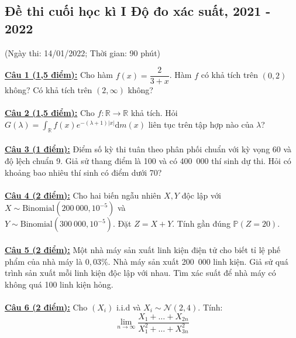 \documentclass[10pt, a4paper]{article}
\begin{document}
\newpage

\subsection{Đề thi cuối học kì I Độ đo xác suất, 2021 - 2022}
\begin{center}
	\color{blue}(Ngày thi: 14/01/2022; Thời gian: 90 phút)
\end{center}
\color{red}\underline{\textbf{Câu 1 (1,5 điểm):}} \color{black}Cho hàm $f(x)=\dfrac{2}{3+x}$. Hàm $f$ có khả tích trên $(0,2)$ không? Có khả tích trên $(2,\infty)$ không?\\\\
\color{red}\underline{\textbf{Câu 2 (1,5 điểm):}} \color{black}Cho $f:\mathbb R\rightarrow\mathbb R$ khả tích. Hỏi $G(\lambda)=\displaystyle\int_{\mathbb R}f(x)e^{-(\lambda+1)|x|}\text{d}m(x)$ liên tục trên tập hợp nào của $\lambda$?\\\\
\color{red}\underline{\textbf{Câu 3 (1 điểm):}} \color{black}Điểm số kỳ thi tuân theo phân phối chuẩn với kỳ vọng 60 và độ lệch chuẩn 9. Giả sử thang điểm là 100 và có 400~000 thí sinh dự thi. Hỏi có khoảng bao nhiêu thí sinh có điểm dưới 70?\\\\
\color{red}\underline{\textbf{Câu 4 (2 điểm):}} \color{black}Cho hai biến ngẫu nhiên $X,Y$ độc lập với $X\sim\text{Binomial}\left(200~000,10^{-5}\right)$ và\\ $Y\sim\text{Binomial}\left(300~000,10^{-5}\right)$. Đặt $Z=X+Y$. Tính gần đúng $\mathbb P(Z=20)$.\\\\
\color{red}\underline{\textbf{Câu 5 (2 điểm):}} \color{black}Một nhà máy sản xuất linh kiện điện tử cho biết tỉ lệ phế phẩm của nhà máy là $0,03\%$. Nhà máy sản xuất 200~000 linh kiện. Giả sử quá trình sản xuất mỗi linh kiện độc lập với nhau. Tìm xác suất để nhà máy có không quá 100 linh kiện hỏng.\\\\
\color{red}\underline{\textbf{Câu 6 (2 điểm):}} \color{black}Cho $(X_i)$ i.i.d và $X_i\sim\mathcal N(2,4)$. Tính: $$\displaystyle\lim_{n\rightarrow\infty}\dfrac{X_1+\ldots+X_{2n}}{X_1^2+\ldots+X_{3n}^2}$$

\newpage
\end{document}
